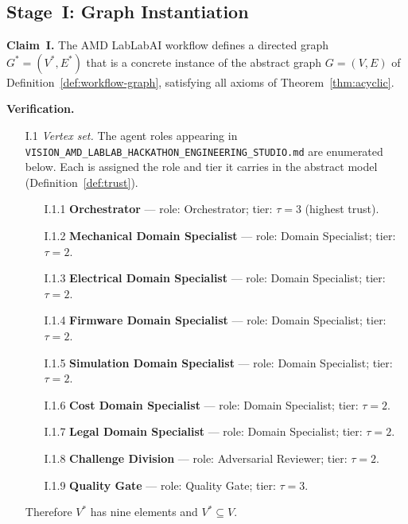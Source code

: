 \documentclass[12pt]{article}
\theoremstyle{definition}
\newcommand{\code}[1]{\texttt{#1}}
\newcommand{\VisionHackathon}{\code{VISION\_AMD\_\allowbreak LABLAB\_\allowbreak HACKATHON\_\allowbreak ENGINEERING\_STUDIO.md}}
\begin{document}
\subsection{Stage~I: Graph Instantiation}
\label{sec:case-study-graph}

\noindent\textbf{Claim~I.} The AMD LabLabAI workflow defines a directed
graph $G^{*} = (V^{*}, E^{*})$ that is a concrete instance of the abstract
graph $G = (V, E)$ of Definition~\ref{def:workflow-graph}, satisfying all axioms
of Theorem~\ref{thm:acyclic}.

\medskip
\noindent\textbf{Verification.}
\begin{enumerate}
    \item[I.1] \emph{Vertex set.}  The agent roles appearing in
               \VisionHackathon{} are enumerated below.  Each is
               assigned the role and tier it carries in the abstract model
               (Definition~\ref{def:trust}).
               \begin{enumerate}
                   \item[I.1.1] \textbf{Orchestrator} --- role: Orchestrator;
                                tier: $\tau = 3$ (highest trust).
                   \item[I.1.2] \textbf{Mechanical Domain Specialist} ---
                                role: Domain Specialist; tier: $\tau = 2$.
                   \item[I.1.3] \textbf{Electrical Domain Specialist} ---
                                role: Domain Specialist; tier: $\tau = 2$.
                   \item[I.1.4] \textbf{Firmware Domain Specialist} ---
                                role: Domain Specialist; tier: $\tau = 2$.
                   \item[I.1.5] \textbf{Simulation Domain Specialist} ---
                                role: Domain Specialist; tier: $\tau = 2$.
                   \item[I.1.6] \textbf{Cost Domain Specialist} ---
                                role: Domain Specialist; tier: $\tau = 2$.
                   \item[I.1.7] \textbf{Legal Domain Specialist} ---
                                role: Domain Specialist; tier: $\tau = 2$.
                   \item[I.1.8] \textbf{Challenge Division} ---
                                role: Adversarial Reviewer; tier: $\tau = 2$.
                   \item[I.1.9] \textbf{Quality Gate} ---
                                role: Quality Gate; tier: $\tau = 3$.
               \end{enumerate}
               Therefore $V^{*}$ has nine elements and $V^{*} \subseteq V$. \checkmark


\end{enumerate}
\end{document}
